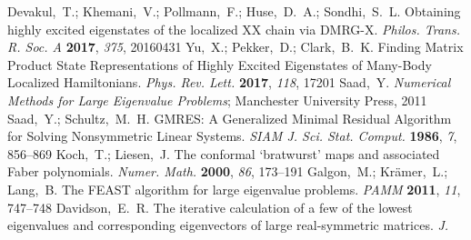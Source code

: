 \documentclass[journal=jctcce]{achemso}
\begin{document}
\begin{mcitethebibliography}{79}
{\mcitedefaultendpunct}{\mcitedefaultseppunct}\relax
\EndOfBibitem
{}
Devakul,~T.; Khemani,~V.; Pollmann,~F.; Huse,~D.~A.; Sondhi,~S.~L. {Obtaining
  highly excited eigenstates of the localized XX chain via DMRG-X}.
  \emph{Philos. Trans. R. Soc. A} \textbf{2017}, \emph{375}, 20160431\relax
\mciteBstWouldAddEndPuncttrue
\mciteSetBstMidEndSepPunct{\mcitedefaultmidpunct}
{\mcitedefaultendpunct}{\mcitedefaultseppunct}\relax
\EndOfBibitem
{}
Yu,~X.; Pekker,~D.; Clark,~B.~K. {Finding Matrix Product State Representations
  of Highly Excited Eigenstates of Many-Body Localized Hamiltonians}.
  \emph{Phys. Rev. Lett.} \textbf{2017}, \emph{118}, 17201\relax
\mciteBstWouldAddEndPuncttrue
\mciteSetBstMidEndSepPunct{\mcitedefaultmidpunct}
{\mcitedefaultendpunct}{\mcitedefaultseppunct}\relax
\EndOfBibitem
{}
Saad,~Y. \emph{{Numerical Methods for Large Eigenvalue Problems}}; Manchester
  University Press, 2011\relax
\mciteBstWouldAddEndPuncttrue
\mciteSetBstMidEndSepPunct{\mcitedefaultmidpunct}
{\mcitedefaultendpunct}{\mcitedefaultseppunct}\relax
\EndOfBibitem
{}
Saad,~Y.; Schultz,~M.~H. {GMRES: A Generalized Minimal Residual Algorithm for
  Solving Nonsymmetric Linear Systems}. \emph{SIAM J. Sci. Stat. Comput.}
  \textbf{1986}, \emph{7}, 856--869\relax
\mciteBstWouldAddEndPuncttrue
\mciteSetBstMidEndSepPunct{\mcitedefaultmidpunct}
{\mcitedefaultendpunct}{\mcitedefaultseppunct}\relax
\EndOfBibitem
{}
Koch,~T.; Liesen,~J. The conformal `bratwurst' maps and associated Faber
  polynomials. \emph{Numer. Math.} \textbf{2000}, \emph{86}, 173–191\relax
\mciteBstWouldAddEndPuncttrue
\mciteSetBstMidEndSepPunct{\mcitedefaultmidpunct}
{\mcitedefaultendpunct}{\mcitedefaultseppunct}\relax
\EndOfBibitem
{}
Galgon,~M.; Kr{\"{a}}mer,~L.; Lang,~B. {The FEAST algorithm for large
  eigenvalue problems}. \emph{PAMM} \textbf{2011}, \emph{11}, 747--748\relax
\mciteBstWouldAddEndPuncttrue
\mciteSetBstMidEndSepPunct{\mcitedefaultmidpunct}
{\mcitedefaultendpunct}{\mcitedefaultseppunct}\relax
\EndOfBibitem
{}
Davidson,~E.~R. {The iterative calculation of a few of the lowest eigenvalues
  and corresponding eigenvectors of large real-symmetric matrices}. \emph{J.
}
\end{mcitethebibliography}
\end{document}
